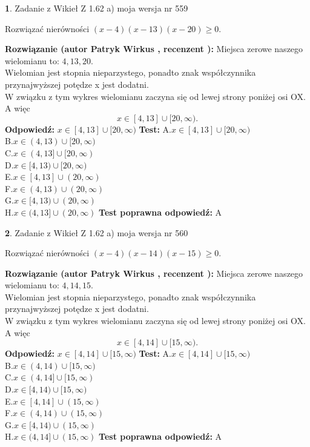 \documentclass[12pt, a4paper]{article}
\theoremstyle{definition} %
\newtheorem{zad}{}
\newcommand{\zadStart}[1]{\begin{zad}#1\newline}
\newcommand{\zadStop}{\end{zad}}
\newcommand{\rozwStart}[2]{\noindent \textbf{Rozwiązanie (autor #1 , recenzent #2): }\newline}
\newcommand{\rozwStop}{\newline}
\newcommand{\odpStart}{\noindent \textbf{Odpowiedź:}\newline}
\newcommand{\odpStop}{\newline}
\newcommand{\testStart}{\noindent \textbf{Test:}\newline}
\newcommand{\testStop}{\newline}
\newcommand{\kluczStart}{\noindent \textbf{Test poprawna odpowiedź:}\newline}
\newcommand{\kluczStop}{\newline}
\begin{document}
\zadStart{Zadanie z Wikieł Z 1.62 a) moja wersja nr 559}

Rozwiązać nierówności $(x-4)(x-13)(x-20)\ge0$.
\zadStop
\rozwStart{Patryk Wirkus}{}
Miejsca zerowe naszego wielomianu to: $4, 13, 20$.\\
Wielomian jest stopnia nieparzystego, ponadto znak współczynnika przy\linebreak najwyższej potędze x jest dodatni.\\ W związku z tym wykres wielomianu zaczyna się od lewej strony poniżej osi OX. A więc $$x \in [4,13] \cup [20,\infty).$$
\rozwStop
\odpStart
$x \in [4,13] \cup [20,\infty)$
\odpStop
\testStart
A.$x \in [4,13] \cup [20,\infty)$\\
B.$x \in (4,13) \cup [20,\infty)$\\
C.$x \in (4,13] \cup [20,\infty)$\\
D.$x \in [4,13) \cup [20,\infty)$\\
E.$x \in [4,13] \cup (20,\infty)$\\
F.$x \in (4,13) \cup (20,\infty)$\\
G.$x \in [4,13) \cup (20,\infty)$\\
H.$x \in (4,13] \cup (20,\infty)$
\testStop
\kluczStart
A
\kluczStop



\zadStart{Zadanie z Wikieł Z 1.62 a) moja wersja nr 560}

Rozwiązać nierówności $(x-4)(x-14)(x-15)\ge0$.
\zadStop
\rozwStart{Patryk Wirkus}{}
Miejsca zerowe naszego wielomianu to: $4, 14, 15$.\\
Wielomian jest stopnia nieparzystego, ponadto znak współczynnika przy\linebreak najwyższej potędze x jest dodatni.\\ W związku z tym wykres wielomianu zaczyna się od lewej strony poniżej osi OX. A więc $$x \in [4,14] \cup [15,\infty).$$
\rozwStop
\odpStart
$x \in [4,14] \cup [15,\infty)$
\odpStop
\testStart
A.$x \in [4,14] \cup [15,\infty)$\\
B.$x \in (4,14) \cup [15,\infty)$\\
C.$x \in (4,14] \cup [15,\infty)$\\
D.$x \in [4,14) \cup [15,\infty)$\\
E.$x \in [4,14] \cup (15,\infty)$\\
F.$x \in (4,14) \cup (15,\infty)$\\
G.$x \in [4,14) \cup (15,\infty)$\\
H.$x \in (4,14] \cup (15,\infty)$
\testStop
\kluczStart
A
\kluczStop
\end{document}
